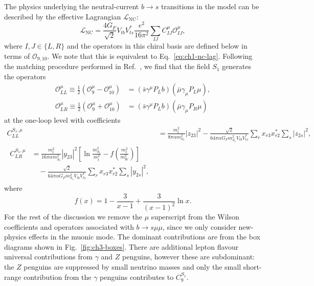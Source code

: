 The physics underlying the neutral-current $b \rightarrow s$ transitions in the
model can be described by the effective Lagrangian $\mathscr{L}_{\text{NC}}$:
\begin{equation}
  \mathscr{L}_{\text{NC}} = \frac{4 G_F}{\sqrt{2}} V_{tb} V^*_{ts} \frac{e^{2}}{16\pi^{2}} \sum_{IJ} C^\mu_{IJ}  \mathscr{O}^{\mu}_{IJ},
\end{equation}
where $I,J \in \{L, R\}$ and the operators in this chiral basis are defined
below in terms of $\mathscr{O}_{9,10}$. We note that this is equivalent to
Eq.~\eqref{eq:ch1-nc-lag}. Following the matching procedure performed in
Ref.~\cite{Misiak:1992bc}, we find that the field $S_{1}$ generates the
operators
\begin{equation}
  \label{eq:ch3-c9-c10-chiral}
  \begin{split}
  \mathscr{O}_{LL}^\mu \equiv
  \frac{1}{2}(\mathscr{O}_9^\mu - \mathscr{O}_{10}^\mu)
  &= (\bar{s}\gamma^\mu P_L b)(\bar{\mu} \gamma_\mu P_L \mu),\\
  \mathscr{O}_{LR}^\mu  \equiv
  \frac{1}{2}(\mathscr{O}_9^\mu + \mathscr{O}_{10}^\mu)
  &= (\bar{s}\gamma^\mu P_L
  b)(\bar{\mu}\gamma_\mu P_R \mu)
  \end{split}
\end{equation}
at the one-loop level with coefficients~\cite{Bauer:2015knc}
\begin{subequations} \label{eq:ch3-cllclreqs}
  \begin{align}
    C_{LL}^{S_{1},\mu} &= \frac{m_t^2}{8 \pi \alpha m_{S_{1}}^2}|z_{23}|^2 -
                         \frac{\sqrt{2}}{64\pi \alpha G_F m_{S_{1}}^2 V_{tb}V^*_{ts}}\sum_r x_{r 3}
                         x_{r 2}^* \sum_s |z_{2 s}|^2 , \label{eq:ch3-cll}\\
    \begin{split}
      C_{LR}^{S_{1},\mu} &= \frac{m_t^2}{16 \pi \alpha m_{S_{1}}^2}|y_{2 3}|^2
      \left[ \ln \frac{m_{S_{1}}^2}{m_t^2} - f \left( \frac{m_t^2}{m_W^2} \right)
      \right]\\ &\quad - \frac{\sqrt{2}}{64\pi \alpha G_F m_{S_{1}}^2
        V_{tb}V^*_{ts}}\sum_r x_{r 3} x_{r 2}^* \sum_s |y_{2 s}|^2, \label{eq:ch3-clr}
    \end{split}
  \end{align}
\end{subequations}
where
\begin{equation}
  f(x) = 1 - \frac{3}{x - 1} + \frac{3}{(x - 1)^2} \ln x.
\end{equation}
For the rest of the discussion we remove the $\mu$ superscript from the Wilson
coefficients and operators associated with $b \to s \mu \mu$, since we only
consider new-physics effects in the muonic mode. The dominant contributions are
from the box diagrams shown in Fig.~\ref{fig:ch3-boxes}. There are additional lepton
flavour universal contributions from $\gamma$ and $Z$ penguins, however these are
subdominant: the $Z$ penguins are suppressed by small neutrino masses and only
the small short-range contribution from the $\gamma$ penguins contributes to
$C^{S_{1}}_9$.

